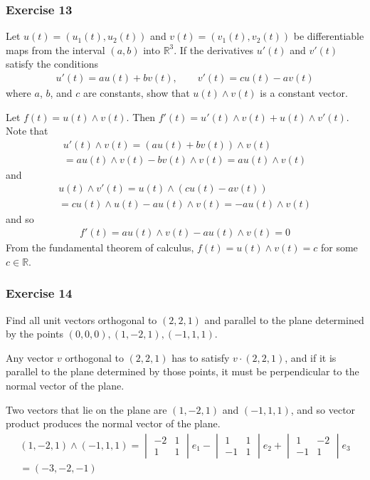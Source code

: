 \documentclass{article}
\newcommand{\R}{\mathbb{R}}
\begin{document}
	\subsubsection*{Exercise 13}
	Let $u(t) = (u_1(t), u_2(t))$ and $v(t) = (v_1(t), v_2(t))$ be differentiable maps from the interval $(a, b)$ into $\R^3$. If the derivatives $u'(t)$ and $v'(t)$ satisfy the conditions
	\begin{gather*}
		u'(t) = au(t) + bv(t), \qquad v'(t) = cu(t) - av(t)
	\end{gather*}
	where $a$, $b$, and $c$ are constants, show that $u(t) \wedge v(t)$ is a constant vector.
	
	Let $f(t) = u(t) \wedge v(t)$. Then $f'(t) = u'(t) \wedge v(t) + u(t) \wedge v'(t)$. Note that
	\begin{gather*}
		u'(t) \wedge v(t) = (au(t) + bv(t)) \wedge v(t) \\
		= a u(t) \wedge v(t) - b v(t) \wedge v(t) = a u(t) \wedge v(t)
	\end{gather*}
	and
	\begin{gather*}
		u(t) \wedge v'(t) = u(t) \wedge (cu(t) - av(t)) \\
		= c u(t) \wedge u(t) - a u(t) \wedge v(t) = - a u(t) \wedge v(t)
	\end{gather*}
	and so
	\begin{gather*}
		f'(t) = a u(t) \wedge v(t) - a u(t) \wedge v(t) = 0
	\end{gather*}
	From the fundamental theorem of calculus, $f(t) = u(t) \wedge v(t) = c$ for some $c \in \R$.
	
	\subsubsection*{Exercise 14}
	Find all unit vectors orthogonal to $(2, 2, 1)$ and parallel to the plane determined by the points $(0, 0, 0), (1, -2, 1), (-1, 1, 1)$.
	
	Any vector $v$ orthogonal to $(2, 2, 1)$ has to satisfy $v \cdot (2, 2, 1)$, and if it is parallel to the plane determined by those points, it must be perpendicular to the normal vector of the plane.
	
	Two vectors that lie on the plane are $(1, -2, 1)$ and $(-1, 1, 1)$, and so vector product produces the normal vector of the plane.
	\begin{gather*}
		(1, -2, 1) \wedge (-1, 1, 1) = 
		\begin{vmatrix}
			-2 & 1 \\
			1 & 1
		\end{vmatrix} e_1 - 
		\begin{vmatrix}
			1 & 1 \\
			-1 & 1
		\end{vmatrix} e_2 + 
		\begin{vmatrix}
			1 & -2 \\
			-1 & 1
		\end{vmatrix} e_3 \\
		= (-3, -2, -1)
	\end{gather*}
	
\end{document}
